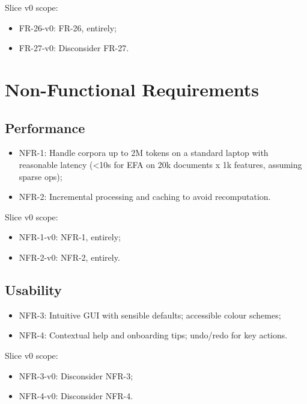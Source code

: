 Slice v0 scope:

\begin{itemize}
    \item FR-26-v0: FR-26, entirely;
    \item FR-27-v0: Disconsider FR-27.
\end{itemize}

\section{Non-Functional Requirements}

\subsection{Performance}

\begin{itemize}
    \item NFR-1: Handle corpora up to 2M tokens on a standard laptop with reasonable latency (\textless 10s for EFA on 20k documents x 1k features, assuming sparse ops);
    \item NFR-2: Incremental processing and caching to avoid recomputation.
\end{itemize}

Slice v0 scope:

\begin{itemize}
    \item NFR-1-v0: NFR-1, entirely;
    \item NFR-2-v0: NFR-2, entirely.
\end{itemize}

\subsection{Usability}

\begin{itemize}
    \item NFR-3: Intuitive GUI with sensible defaults; accessible colour schemes;
    \item NFR-4: Contextual help and onboarding tips; undo/redo for key actions.
\end{itemize}

Slice v0 scope:

\begin{itemize}
    \item NFR-3-v0: Disconsider NFR-3;
    \item NFR-4-v0: Disconsider NFR-4.
\end{itemize}

